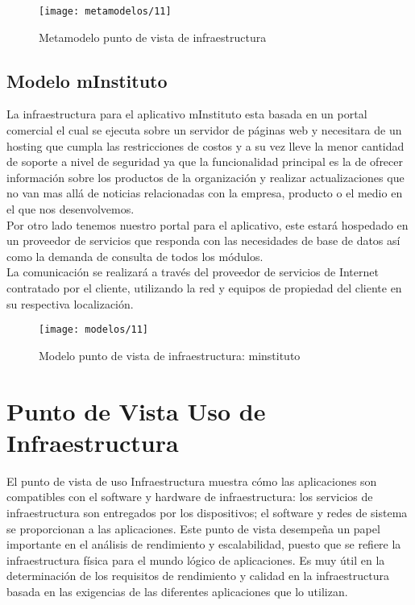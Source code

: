   \begin{figure}[H]
	\centering
	\texttt{[image: metamodelos/11]}
	\captionsetup{width=.95\textwidth}
	\caption{Metamodelo punto de vista de infraestructura}
	\label{metamodelo11}
  \end{figure}

  \subsection{Modelo mInstituto}
  La infraestructura para el aplicativo mInstituto esta basada en un portal comercial el cual se ejecuta sobre un servidor de páginas web y necesitara de un hosting que cumpla las restricciones de costos y a su vez lleve la menor cantidad de soporte a nivel de seguridad ya que la funcionalidad principal es la de ofrecer información sobre los productos de la organización y realizar actualizaciones que no van mas allá de noticias relacionadas con la empresa, producto o el medio en el que nos desenvolvemos. \\
  
  Por otro lado tenemos nuestro portal para el aplicativo, este estará hospedado en un proveedor de servicios que responda con las necesidades de base de datos así como la demanda de consulta de todos los módulos.  \\
  
  La comunicación se realizará a través del proveedor de servicios de Internet contratado por el cliente, utilizando la red y equipos de propiedad del cliente en su respectiva localización. \\
  
  \begin{figure}[H]
	\centering
	\texttt{[image: modelos/11]}
 	\captionsetup{width=.95\textwidth}
	\caption{Modelo punto de vista de infraestructura: minstituto}
	\label{modelo11}
  \end{figure}
  
  \section{Punto de Vista Uso de Infraestructura}
  El punto de vista de uso Infraestructura muestra cómo las aplicaciones son compatibles con el software y hardware de infraestructura: los servicios de infraestructura son entregados por los dispositivos; el software y redes de sistema se proporcionan a las aplicaciones. Este punto de vista desempeña un papel importante en el análisis de rendimiento y escalabilidad, puesto que se refiere la infraestructura física para el mundo lógico de aplicaciones. Es muy útil en la determinación de los requisitos de rendimiento y calidad en la infraestructura basada en las exigencias de las diferentes aplicaciones que lo utilizan.
  
